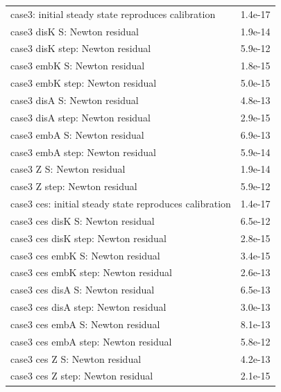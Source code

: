 \begin{tabular}{lc}
case3: initial steady state reproduces calibration & 1.4e-17\\
case3 disK S: Newton residual & 1.9e-14\\
case3 disK step: Newton residual & 5.9e-12\\
case3 embK S: Newton residual & 1.8e-15\\
case3 embK step: Newton residual & 5.0e-15\\
case3 disA S: Newton residual & 4.8e-13\\
case3 disA step: Newton residual & 2.9e-15\\
case3 embA S: Newton residual & 6.9e-13\\
case3 embA step: Newton residual & 5.9e-14\\
case3 Z S: Newton residual & 1.9e-14\\
case3 Z step: Newton residual & 5.9e-12\\
case3 ces: initial steady state reproduces calibration & 1.4e-17\\
case3 ces disK S: Newton residual & 6.5e-12\\
case3 ces disK step: Newton residual & 2.8e-15\\
case3 ces embK S: Newton residual & 3.4e-15\\
case3 ces embK step: Newton residual & 2.6e-13\\
case3 ces disA S: Newton residual & 6.5e-13\\
case3 ces disA step: Newton residual & 3.0e-13\\
case3 ces embA S: Newton residual & 8.1e-13\\
case3 ces embA step: Newton residual & 5.8e-12\\
case3 ces Z S: Newton residual & 4.2e-13\\
case3 ces Z step: Newton residual & 2.1e-15\\
\bottomrule\end{tabular}
